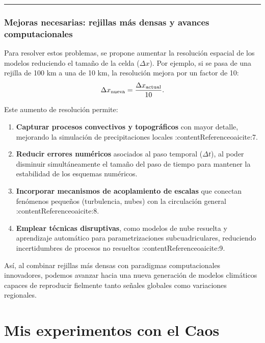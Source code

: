 \documentclass[
  11pt,
  a4paper,
  DIV=11,
  numbers=noendperiod]{scrreprt}
\providecommand{\tightlist}{%
  \setlength{\itemsep}{0pt}\setlength{\parskip}{0pt}}
\begin{document}
\begin{center}\rule{0.5\linewidth}{0.5pt}\end{center}

\section{Mejoras necesarias: rejillas más densas y avances
computacionales}\label{mejoras-necesarias-rejillas-muxe1s-densas-y-avances-computacionales}

Para resolver estos problemas, se propone aumentar la resolución
espacial de los modelos reduciendo el tamaño de la celda (\(\Delta x\)).
Por ejemplo, si se pasa de una rejilla de 100 km a una de 10 km, la
resolución mejora por un factor de 10: \[
\Delta x_{\rm nueva} = \frac{\Delta x_{\rm actual}}{10}.
\]

Este aumento de resolución permite:

\begin{enumerate}
\def\labelenumi{\arabic{enumi}.}
\tightlist
\item
  \textbf{Capturar procesos convectivos y topográficos} con mayor
  detalle, mejorando la simulación de precipitaciones locales
  :contentReference{oaicite:7}.\\
\item
  \textbf{Reducir errores numéricos} asociados al paso temporal
  (\(\Delta t\)), al poder disminuir simultáneamente el tamaño del paso
  de tiempo para mantener la estabilidad de los esquemas numéricos.\\
\item
  \textbf{Incorporar mecanismos de acoplamiento de escalas} que conectan
  fenómenos pequeños (turbulencia, nubes) con la circulación general
  :contentReference{oaicite:8}.\\
\item
  \textbf{Emplear técnicas disruptivas}, como modelos de nube resuelta y
  aprendizaje automático para parametrizaciones subcuadriculares,
  reduciendo incertidumbres de procesos no resueltos
  :contentReference{oaicite:9}.
\end{enumerate}

Así, al combinar rejillas más densas con paradigmas computacionales
innovadores, podemos avanzar hacia una nueva generación de modelos
climáticos capaces de reproducir fielmente tanto señales globales como
variaciones regionales.

\part{Mis experimentos con el Caos}
\end{document}
